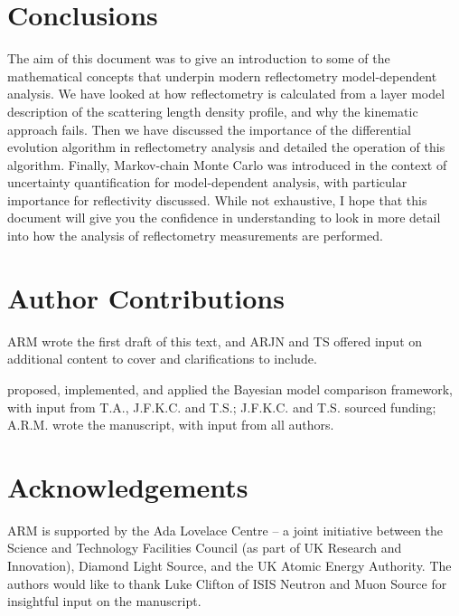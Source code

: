 \documentclass[
 reprint,
 superscriptaddress,
 amsmath,amssymb,
 aps,
]{revtex4-1}
\begin{document}
\section{Conclusions}
The aim of this document was to give an introduction to some of the mathematical concepts that underpin modern reflectometry model-dependent analysis. 
We have looked at how reflectometry is calculated from a layer model description of the scattering length density profile, and why the kinematic approach fails. 
Then we have discussed the importance of the differential evolution algorithm in reflectometry analysis and detailed the operation of this algorithm. 
Finally, Markov-chain Monte Carlo was introduced in the context of uncertainty quantification for model-dependent analysis, with particular importance for reflectivity discussed. 
While not exhaustive, I hope that this document will give you the confidence in understanding to look in more detail into how the analysis of reflectometry measurements are performed.

\section*{Author Contributions}
ARM wrote the first draft of this text, and ARJN and TS offered input on additional content to cover and clarifications to include. 


proposed, implemented, and applied the Bayesian model comparison framework, with input from T.A., J.F.K.C. and T.S.; J.F.K.C. and T.S. sourced funding; A.R.M. wrote the manuscript, with input from all authors.


\section*{Acknowledgements}
ARM is supported by the Ada Lovelace Centre – a joint initiative between the Science and Technology Facilities Council (as part of UK Research and Innovation), Diamond Light Source, and the UK Atomic Energy Authority.
The authors would like to thank Luke Clifton of ISIS Neutron and Muon Source for insightful input on the manuscript.




\end{document}
